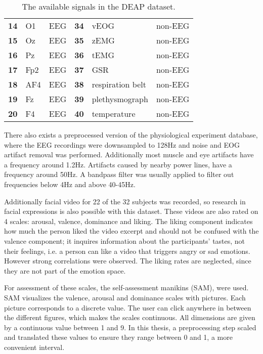 \begin{table}[H]
\begin{tabular}{l|ll|l|ll}
\textbf{14}      & O1            & EEG               & \textbf{34}      & vEOG             & non-EEG           \\
\textbf{15}      & Oz            & EEG               & \textbf{35}      & zEMG             & non-EEG           \\
\textbf{16}      & Pz            & EEG               & \textbf{36}      & tEMG             & non-EEG           \\
\textbf{17}      & Fp2           & EEG               & \textbf{37}      & GSR              & non-EEG           \\
\textbf{18}      & AF4           & EEG               & \textbf{38}      & respiration belt & non-EEG           \\
\textbf{19}      & Fz            & EEG               & \textbf{39}      & plethysmograph   & non-EEG           \\
\textbf{20}      & F4            & EEG               & \textbf{40}      & temperature      & non-EEG          
\end{tabular}
\caption{The available signals in the DEAP dataset\label{DEAPSignals}.}
\end{table}

\npar

There also exists a preprocessed version of the physiological experiment database, where the EEG recordings were downsampled to 128Hz and noise and EOG artifact removal was performed. Additionally most muscle and eye artifacts have a frequency around 1.2Hz. Artifacts caused by nearby power lines, have a frequency around 50Hz\cite{ExtendedPaper}. A bandpass filter was usually applied to filter out frequencies below 4Hz and above 40-45Hz.

\npar

Additionally facial video for 22 of the 32 subjects was recorded, so research in facial expressions is also possible with this dataset. These videos are also rated on 4 scales: arousal, valence, dominance and liking. The liking component indicates how much the person liked the video excerpt and should not be confused with the valence component; it inquires information about the participants' tastes, not their feelings, i.e. a person can like a video that triggers angry or sad emotions. However strong correlations were observed\citep{DEAP}. The liking rates are neglected, since they are not part of the emotion space.

\npar

For assessment of these scales, the self-assessment manikins (SAM), were used\cite{DEAP}. SAM visualizes the valence, arousal and dominance scales with pictures. Each picture corresponds to a discrete value. The user can click anywhere in between the different figures, which makes the scales continuous. All dimensions are given by a continuous value between 1 and 9. In this thesis, a preprocessing step scaled and translated these values to ensure they range between 0 and 1, a more convenient interval.

